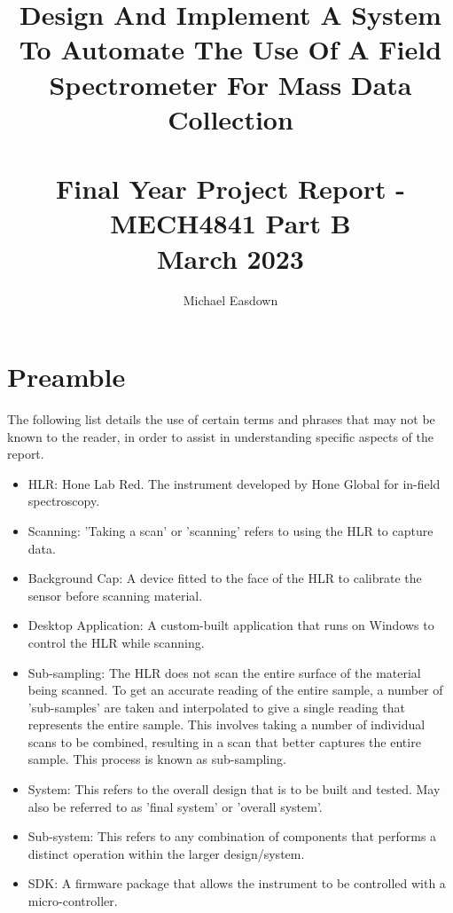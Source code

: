 \documentclass{UoNMCHA}
\numberwithin{equation}{section}
\begin{document}
	\newpage
	\title{Design And Implement A System To Automate The Use Of A Field Spectrometer For Mass Data Collection \\ \ \\
		{\small Final Year Project Report - MECH4841 Part B  \\March 2023}}
	\author[UoNMCHA]{Michael Easdown}
	\address[UoNMCHA]{
		Student of Mechatronics Engineering,\\
		The University of Newcastle, Callaghan, NSW 2308, AUSTRALIA \\
		Student Number: 3184567 \\
		E-mail: \href{mailto:michael.easdown@uon.edu.au}{\textsf{michael.easdown@uon.edu.au}}}
\maketitle
\onecolumn
\newpage
\section*{Preamble}\label{sec:Preamble}
The following list details the use of certain terms and phrases that may not be known to the reader, in order to assist in understanding specific aspects of the report.\\
\begin{itemize}
	\item HLR: Hone Lab Red. The instrument developed by Hone Global for in-field spectroscopy.
	\item Scanning: 'Taking a scan' or 'scanning' refers to using the HLR to capture data.
	\item Background Cap: A device fitted to the face of the HLR to calibrate the sensor before scanning material.
	\item Desktop Application: A custom-built application that runs on Windows to control the HLR while scanning.
	\item Sub-sampling: The HLR does not scan the entire surface of the material being scanned. To get an accurate reading of the entire sample, a number of 'sub-samples' are taken and interpolated to give a single reading that represents the entire sample. This involves taking a number of individual scans to be combined, resulting in a scan that better captures the entire sample. This process is known as sub-sampling.
	\item System: This refers to the overall design that is to be built and tested. May also be referred to as 'final system' or 'overall system'.
	\item Sub-system: This refers to any combination of components that performs a distinct operation within the larger design/system.
	\item SDK: A firmware package that allows the instrument to be controlled with a micro-controller.
\end{itemize}
\newpage
\end{document}

